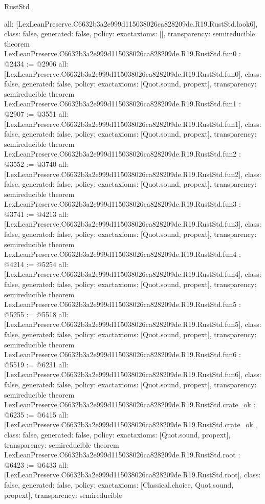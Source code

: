\begin{lexlean}{RustStd}
\begin{coremodule}
{  all: [LexLeanPreserve.C6632b3a2e999d115038026ca828209de.R19.RustStd.look6],
  class: false,
  generated: false,
  policy: exact{axioms: []},
  transparency: semireducible
}
theorem LexLeanPreserve.C6632b3a2e999d115038026ca828209de.R19.RustStd.fun0 : @2434 := @2906 {
  all: [LexLeanPreserve.C6632b3a2e999d115038026ca828209de.R19.RustStd.fun0],
  class: false,
  generated: false,
  policy: exact{axioms: [Quot.sound, propext]},
  transparency: semireducible
}
theorem LexLeanPreserve.C6632b3a2e999d115038026ca828209de.R19.RustStd.fun1 : @2907 := @3551 {
  all: [LexLeanPreserve.C6632b3a2e999d115038026ca828209de.R19.RustStd.fun1],
  class: false,
  generated: false,
  policy: exact{axioms: [Quot.sound, propext]},
  transparency: semireducible
}
theorem LexLeanPreserve.C6632b3a2e999d115038026ca828209de.R19.RustStd.fun2 : @3552 := @3740 {
  all: [LexLeanPreserve.C6632b3a2e999d115038026ca828209de.R19.RustStd.fun2],
  class: false,
  generated: false,
  policy: exact{axioms: [Quot.sound, propext]},
  transparency: semireducible
}
theorem LexLeanPreserve.C6632b3a2e999d115038026ca828209de.R19.RustStd.fun3 : @3741 := @4213 {
  all: [LexLeanPreserve.C6632b3a2e999d115038026ca828209de.R19.RustStd.fun3],
  class: false,
  generated: false,
  policy: exact{axioms: [Quot.sound, propext]},
  transparency: semireducible
}
theorem LexLeanPreserve.C6632b3a2e999d115038026ca828209de.R19.RustStd.fun4 : @4214 := @5254 {
  all: [LexLeanPreserve.C6632b3a2e999d115038026ca828209de.R19.RustStd.fun4],
  class: false,
  generated: false,
  policy: exact{axioms: [Quot.sound, propext]},
  transparency: semireducible
}
theorem LexLeanPreserve.C6632b3a2e999d115038026ca828209de.R19.RustStd.fun5 : @5255 := @5518 {
  all: [LexLeanPreserve.C6632b3a2e999d115038026ca828209de.R19.RustStd.fun5],
  class: false,
  generated: false,
  policy: exact{axioms: [Quot.sound, propext]},
  transparency: semireducible
}
theorem LexLeanPreserve.C6632b3a2e999d115038026ca828209de.R19.RustStd.fun6 : @5519 := @6231 {
  all: [LexLeanPreserve.C6632b3a2e999d115038026ca828209de.R19.RustStd.fun6],
  class: false,
  generated: false,
  policy: exact{axioms: [Quot.sound, propext]},
  transparency: semireducible
}
theorem LexLeanPreserve.C6632b3a2e999d115038026ca828209de.R19.RustStd.crate_ok : @6235 := @6415 {
  all: [LexLeanPreserve.C6632b3a2e999d115038026ca828209de.R19.RustStd.crate_ok],
  class: false,
  generated: false,
  policy: exact{axioms: [Quot.sound, propext]},
  transparency: semireducible
}
theorem LexLeanPreserve.C6632b3a2e999d115038026ca828209de.R19.RustStd.root : @6423 := @6433 {
  all: [LexLeanPreserve.C6632b3a2e999d115038026ca828209de.R19.RustStd.root],
  class: false,
  generated: false,
  policy: exact{axioms: [Classical.choice, Quot.sound, propext]},
  transparency: semireducible
}


\end{coremodule}
\end{lexlean}
